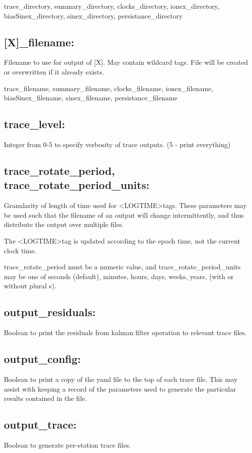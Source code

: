 trace\_directory, summary\_directory, clocks\_directory, ionex\_directory, biasSinex\_directory, sinex\_directory, persistance\_directory

\subsection{[X]\_filename:}
Filename to use for output of [X]. May contain wildcard tags. File will be created or overwritten if it already exists.

trace\_filename, summary\_filename, clocks\_filename, ionex\_filename, biasSinex\_filename, sinex\_filename, persistance\_filename

\subsection{trace\_level:}
Integer from 0-5 to specify verbosity of trace outputs. (5 - print everything)

\subsection{trace\_rotate\_period, trace\_rotate\_period\_units:}
Granularity of length of time used for \textless LOGTIME\textgreater tags. These parameters may be used such that the filename of an output will change intermittently, and thus distribute the output over multiple files.

The \textless LOGTIME\textgreater tag is updated according to the epoch time, not the current clock time.

trace\_rotate\_period must be a numeric value, and trace\_rotate\_period\_units may be one of seconds (default), minutes, hours, days, weeks, years, (with or without plural s).

\subsection{output\_residuals:}
Boolean to print the residuals from kalman filter operation to relevant trace files.

\subsection{output\_config:}
Boolean to print a copy of the yaml file to the top of each trace file. This may assist with keeping a record of the parameters used to generate the particular results contained in the file.

\subsection{output\_trace:}
Boolean to generate per-station trace files.

